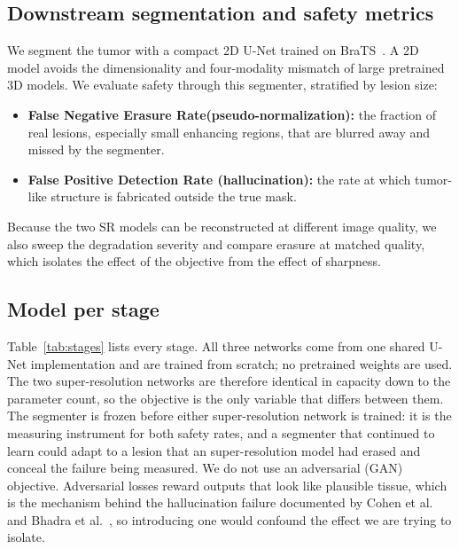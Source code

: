 \documentclass[11pt,a4paper]{article}
\newcommand{\FNER}{False Negative Erasure Rate\xspace}
\newcommand{\SR}{super-resolution\xspace}
\begin{document}
\subsection{Downstream segmentation and safety metrics}
We segment the tumor with a compact 2D U-Net trained on BraTS~\cite{menze2015}. A 2D model avoids the dimensionality and four-modality mismatch of large pretrained 3D models. We evaluate safety through this segmenter, stratified by lesion size:
\begin{itemize}
  \item \textbf{\FNER (pseudo-normalization):} the fraction of real lesions, especially small enhancing regions, that are blurred away and missed by the segmenter.
  \item \textbf{False Positive Detection Rate (hallucination):} the rate at which tumor-like structure is fabricated outside the true mask.
\end{itemize}
Because the two SR models can be reconstructed at different image quality, we also sweep the degradation severity and compare erasure at matched quality, which isolates the effect of the objective from the effect of sharpness.

\subsection{Model per stage}
Table~\ref{tab:stages} lists every stage. All three networks come from one shared U-Net implementation and are trained from scratch; no pretrained weights are used. The two \SR networks are therefore identical in capacity down to the parameter count, so the objective is the only variable that differs between them. The segmenter is frozen before either \SR network is trained: it is the measuring instrument for both safety rates, and a segmenter that continued to learn could adapt to a lesion that an \SR model had erased and conceal the failure being measured. We do not use an adversarial (GAN) objective. Adversarial losses reward outputs that look like plausible tissue, which is the mechanism behind the hallucination failure documented by Cohen et al.~\cite{cohen2018} and Bhadra et al.~\cite{bhadra2021}, so introducing one would confound the effect we are trying to isolate.
\end{document}

